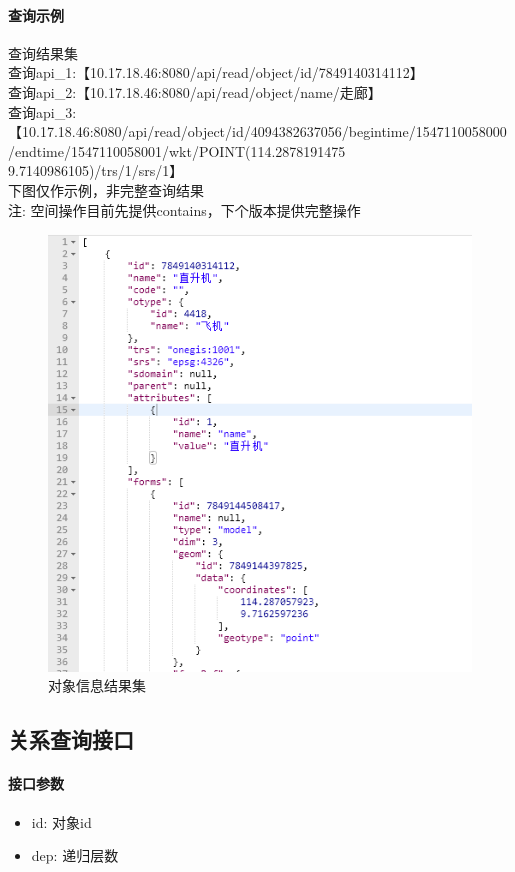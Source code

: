 \documentclass[UTF8, 12pt]{ctexart}
\begin{document}
	\paragraph{查询示例}
		查询结果集 \\
		查询api\_1:【10.17.18.46:8080/api/read/object/id/7849140314112】 \\
		查询api\_2:【10.17.18.46:8080/api/read/object/name/走廊】 \\
		查询api\_3:【10.17.18.46:8080/api/read/object/id/4094382637056/begintime/1547110058000/endtime/1547110058001/wkt/POINT(114.2878191475 9.7140986105)/trs/1/srs/1】 \\
		下图仅作示例，非完整查询结果 \\
		{\color{red}注: 空间操作目前先提供contains，下个版本提供完整操作}
		\begin{figure}[H]
			\centering
			\includegraphics[width = 0.7\linewidth]{object.png}
			\caption{对象信息结果集}
			\label{Fig:1}
			\vspace{-0.5cm}
		\end{figure}

\subsection{关系查询接口}
	\paragraph{接口参数}
		\begin{itemize}
			\item id: 对象id
			\item dep: 递归层数
		\end{itemize}
\end{document}
